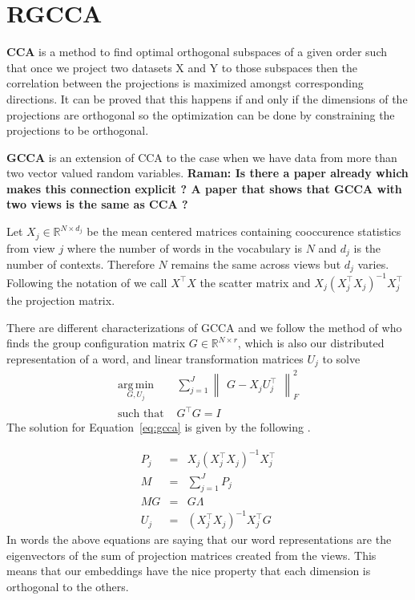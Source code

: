 \documentclass[11pt]{article}
\begin{document}
\section{RGCCA}
\label{sec:gcca}
\textbf{CCA} is a method to find optimal orthogonal subspaces of a given order such that once we
project two datasets X and Y to those subspaces then the correlation
between the projections is maximized amongst corresponding
directions. It can be proved that this happens if and only if the
dimensions of the projections are orthogonal so the optimization can
be done by constraining the projections to be orthogonal.

\textbf{GCCA} \cite{kettenring1971canonical,carroll1968generalization} is an
extension of CCA to the case when we have data from more than two
vector valued random variables. \textbf{Raman: Is there a paper
  already which makes this connection explicit ? A paper that shows
  that GCCA with two views is the same as CCA ?}

Let $X_j \in \mathbb{R}^{N\times d_j}$ be the mean centered matrices
containing cooccurence statistics from view 
$j$ where the number of words in the vocabulary is $N$ and $d_j$ is
the number of contexts. Therefore $N$ remains the same across views
but  $d_j$ varies. Following the notation of \cite{hastie2009elements} we call $X^\top X$
the scatter matrix and $X_j (X_j^\top X_j)^{-1}X_j^\top$ the
projection matrix.

There are different characterizations of GCCA and we follow the method
of \cite{carroll1968generalization} who finds the
 group configuration matrix $G \in \mathbb{R}^{N\times r}$, which is
 also our distributed representation of a word, and linear transformation matrices
 $U_j$ to solve 
\begin{equation}
  \label{eq:gcca}
\begin{split}
  \operatorname*{arg\,min}_{G,U_j} & \sum_{j=1}^J \begin{Vmatrix} G - X_jU_j^\top \end{Vmatrix}^2_F \\
  \text{such that } & G^\top G = I
\end{split}
\end{equation}
The solution for Equation~\ref{eq:gcca} is given by the following \cite{carroll1968generalization}.

\begin{eqnarray}
P_j &=& X_j(X_j^\top X_j)^{-1}X_j^\top \\
M &=& \sum_{j=1}^J P_j\\
M G &=& G \Lambda\\
U_j &=& \left(X_j^\top X_j\right)^{-1} X_j^\top G
\end{eqnarray}
In words the above
equations are saying that our word representations are the
eigenvectors of the sum of projection matrices created from the
views. This means that our embeddings have the nice property that each
dimension is orthogonal to the others.
\end{document}
